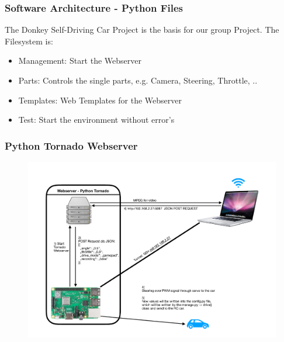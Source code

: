 \documentclass{beamer}
\begin{document}

\begin{frame}
\frametitle{Software Architecture - Python Files}
The Donkey Self-Driving Car Project is the basis for our group Project. The Filesystem is: \\
\begin{itemize}
\item Management: Start the Webserver
\item Parts: Controls the single parts, e.g. Camera, Steering, Throttle, ..
\item Templates: Web Templates for the Webserver
\item Test: Start the environment without error's
\end{itemize}
\end{frame}



\begin{frame}
\frametitle{Python Tornado Webserver}
\begin{figure}
\includegraphics[width=0.9\linewidth]{photo/webserver.pdf}
\end{figure}
\end{frame}

\end{document}
